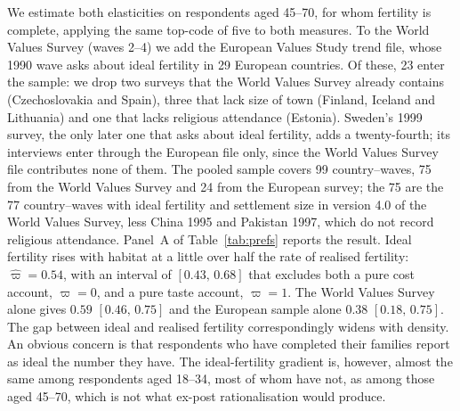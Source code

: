 \documentclass[11pt]{article}
\begin{document}
We estimate both elasticities on respondents aged 45--70, for whom fertility is complete, applying
the same top-code of five to both measures. To the World Values Survey (waves 2--4) we add the
European Values Study trend file, whose 1990 wave asks about ideal fertility in 29 European countries.
Of these, 23 enter the sample: we drop two surveys that the World Values Survey already contains
(Czechoslovakia and Spain), three that lack size of town (Finland, Iceland and Lithuania) and one
that lacks religious attendance (Estonia). Sweden's 1999 survey, the only later one that asks about ideal
fertility, adds a twenty-fourth; its interviews enter through the European file only, since the World
Values Survey file contributes none of them. The pooled sample covers 99 country--waves, 75 from the World Values
Survey and 24 from the European survey; the 75 are the 77 country--waves with ideal fertility and settlement size in version 4.0 of the
World Values Survey, less China 1995 and Pakistan 1997, which do not record religious attendance. Panel~A of
Table~\ref{tab:prefs} reports the result. Ideal fertility rises with habitat at a little over half
the rate of realised fertility: $\hat\varpi=0.54$, with an interval of $[0.43,\,0.68]$ that excludes
both a pure cost account, $\varpi=0$, and a pure taste account, $\varpi=1$. The World Values Survey
alone gives $0.59$ $[0.46,\,0.75]$ and the European sample alone $0.38$ $[0.18,\,0.75]$. The gap between ideal and realised fertility correspondingly widens with density. An
obvious concern is that respondents who have completed their families report as ideal the number
they have. The ideal-fertility gradient is, however, almost the same among respondents aged
18--34, most of whom have not, as among those aged 45--70, which is not what ex-post
rationalisation would produce.
\end{document}
